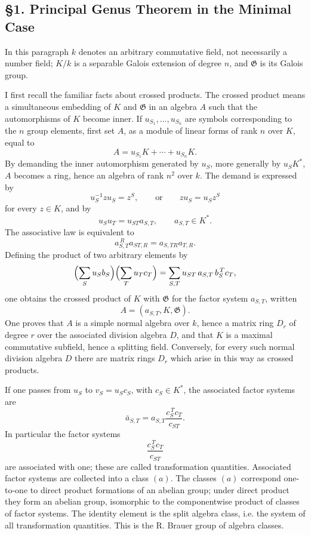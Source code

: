 \documentclass[11pt]{article}
\providecommand{\Gg}{\mathfrak G}
\begin{document}
\subsection*{§1. Principal Genus Theorem in the Minimal Case}

In this paragraph \(k\) denotes an arbitrary commutative field, not necessarily a number field; \(K/k\) is a separable Galois extension of degree \(n\), and \(\Gg\) is its Galois group.

I first recall the familiar facts about crossed products. The crossed product means a simultaneous embedding of \(K\) and \(\Gg\) in an algebra \(A\) such that the automorphisms of \(K\) become inner. If \(u_{S_1},\ldots,u_{S_n}\) are symbols corresponding to the \(n\) group elements, first set \(A\), as a module of linear forms of rank \(n\) over \(K\), equal to
\[
        A=u_{S_1}K+\cdots+u_{S_n}K .                         \tag{1}
\]
By demanding the inner automorphism generated by \(u_S\), more generally by \(u_SK^*\), \(A\) becomes a ring, hence an algebra of rank \(n^2\) over \(k\). The demand is expressed by
\[
        u_S^{-1}zu_S=z^S,\qquad\text{or}\qquad
        z u_S=u_S z^S                                      \tag{2}
\]
for every \(z\in K\), and by
\[
        u_Su_T=u_{ST}a_{S,T},\qquad a_{S,T}\in K^*.           \tag{3}
\]
The associative law is equivalent to
\[
        a_{S,T}^{\,R}a_{ST,R}=a_{S,TR}a_{T,R}.                \tag{4}
\]
Defining the product of two arbitrary elements by
\[
 \Bigl(\sum_S u_S b_S\Bigr)\Bigl(\sum_T u_T c_T\Bigr)
   =\sum_{S,T}u_{ST}\,a_{S,T}\,b_S^{\,T}c_T ,
\]
one obtains the crossed product of \(K\) with \(\Gg\) for the factor system \(a_{S,T}\), written
\[
        A=(a_{S,T},K,\Gg).
\]
One proves that \(A\) is a simple normal algebra over \(k\), hence a matrix ring \(D_r\) of degree \(r\) over the associated division algebra \(D\), and that \(K\) is a maximal commutative subfield, hence a splitting field. Conversely, for every such normal division algebra \(D\) there are matrix rings \(D_r\) which arise in this way as crossed products.

If one passes from \(u_S\) to \(v_S=u_Sc_S\), with \(c_S\in K^*\), the associated factor systems are
\[
        \bar a_{S,T}
        =a_{S,T}\frac{c_S^{\,T}c_T}{c_{ST}} .                 \tag{5}
\]
In particular the factor systems
\[
        \frac{c_S^{\,T}c_T}{c_{ST}}
\]
are associated with one; these are called transformation quantities. Associated factor systems are collected into a class \((a)\). The classes \((a)\) correspond one-to-one to direct product formations of an abelian group; under direct product they form an abelian group, isomorphic to the componentwise product of classes of factor systems. The identity element is the split algebra class, i.e. the system of all transformation quantities. This is the R. Brauer group of algebra classes.
\end{document}
